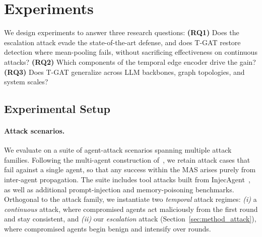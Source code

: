 \section{Experiments}
\label{sec:experiments}


We design experiments to answer three research questions:
\textbf{(RQ1)} Does the escalation attack evade the state-of-the-art defense, and
does T-GAT restore detection where mean-pooling fails, without sacrificing
effectiveness on continuous attacks?
\textbf{(RQ2)} Which components of the temporal edge encoder drive the gain?
\textbf{(RQ3)} Does T-GAT generalize across LLM backbones, graph topologies, and
system scales?

\subsection{Experimental Setup}
\label{sec:exp_setup}

\paragraph{Attack scenarios.}
We evaluate on a suite of agent-attack scenarios spanning multiple attack
families. Following the multi-agent construction of~\citet{wang2025gsafeguard}, we
retain attack cases that fail against a single agent, so that any success within
the MAS arises purely from inter-agent propagation. The suite includes tool
attacks built from InjecAgent~\citep{zhan2024injecagent}, as well as additional
prompt-injection and memory-poisoning benchmarks. Orthogonal to the attack family,
we instantiate two \emph{temporal} attack regimes: \emph{(i)} a \emph{continuous}
attack, where compromised agents act maliciously from the first round and stay
consistent, and \emph{(ii)} our \emph{escalation} attack
(Section~\ref{sec:method_attack}), where compromised agents begin benign and
intensify over rounds.

